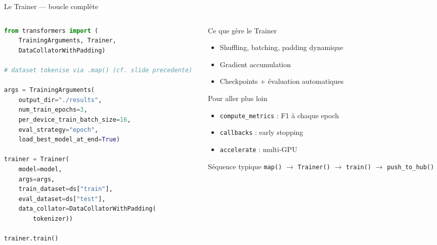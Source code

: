 \documentclass[aspectratio=169, 10pt]{beamer}
\begin{document}
\begin{frame}[fragile]{Le Trainer --- boucle complète}
  \begin{columns}[T]
    \begin{column}{0.52\textwidth}
\begin{lstlisting}[language=Python, basicstyle=\tiny\ttfamily]
from transformers import (
    TrainingArguments, Trainer,
    DataCollatorWithPadding)

# dataset tokenise via .map() (cf. slide precedente)

args = TrainingArguments(
    output_dir="./results",
    num_train_epochs=3,
    per_device_train_batch_size=16,
    eval_strategy="epoch",
    load_best_model_at_end=True)

trainer = Trainer(
    model=model,
    args=args,
    train_dataset=ds["train"],
    eval_dataset=ds["test"],
    data_collator=DataCollatorWithPadding(
        tokenizer))

trainer.train()
\end{lstlisting}
    \end{column}
    \begin{column}{0.44\textwidth}
      \begin{block}{Ce que gère le Trainer}
        \begin{itemize}
          \item Shuffling, batching, padding dynamique
          \item Gradient accumulation
          \item Checkpoints + évaluation automatiques
        \end{itemize}
      \end{block}
      \vspace{2pt}
      \begin{exampleblock}{Pour aller plus loin}
        \begin{itemize}
          \item \texttt{compute\_metrics} : F1 à chaque epoch
          \item \texttt{callbacks} : early stopping
          \item \texttt{accelerate} : multi-GPU
        \end{itemize}
      \end{exampleblock}
      \vspace{2pt}
      \begin{alertblock}{Séquence typique}
        \texttt{map()} $\to$ \texttt{Trainer()} $\to$
        \texttt{train()} $\to$ \texttt{push\_to\_hub()}
      \end{alertblock}
    \end{column}
  \end{columns}
\end{frame}
\end{document}
